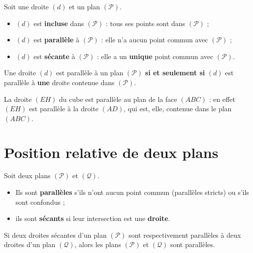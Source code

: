 \begin{definition}
Soit une droite $(d)$ et un plan $(\mathcal{P})$.
\begin{itemize}
  \item $(d)$ est \textbf{incluse} dans $(\mathcal{P})$ : tous ses points sont dans
        $(\mathcal{P})$ ;
  \item $(d)$ est \textbf{parallèle} à $(\mathcal{P})$ : elle n'a aucun point commun
        avec $(\mathcal{P})$ ;
  \item $(d)$ est \textbf{sécante} à $(\mathcal{P})$ : elle a un \textbf{unique}
        point commun avec $(\mathcal{P})$.
\end{itemize}
\end{definition}

\begin{theoreme}
Une droite $(d)$ est parallèle à un plan $(\mathcal{P})$ \textbf{si et seulement si}
$(d)$ est parallèle à \textbf{une} droite contenue dans $(\mathcal{P})$.
\end{theoreme}

\begin{exemple}
La droite $(EH)$ du cube est parallèle au plan de la face $(ABC)$ : en effet $(EH)$
est parallèle à la droite $(AD)$, qui est, elle, contenue dans le plan $(ABC)$.
\end{exemple}

\section{Position relative de deux plans}

\begin{definition}
Soit deux plans $(\mathcal{P})$ et $(\mathcal{Q})$.
\begin{itemize}
  \item Ils sont \textbf{parallèles} s'ils n'ont aucun point commun (parallèles
        stricts) ou s'ils sont confondus ;
  \item ils sont \textbf{sécants} si leur intersection est une \textbf{droite}.
\end{itemize}
\end{definition}

\begin{propriete}
Si deux droites sécantes d'un plan $(\mathcal{P})$ sont respectivement parallèles à
deux droites d'un plan $(\mathcal{Q})$, alors les plans $(\mathcal{P})$ et
$(\mathcal{Q})$ sont parallèles.
\end{propriete}

